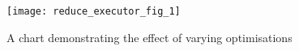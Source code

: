 \begin{figure}[htb]
    \centering
    \texttt{[image: reduce\_executor\_fig\_1]}
    \caption{A chart demonstrating the effect of varying optimisations}
    \label{fig:reduce_executor_performance_on_count}
\end{figure}
